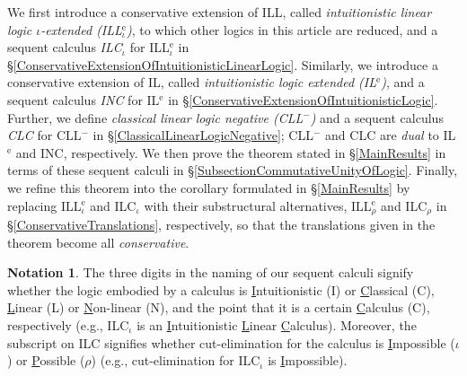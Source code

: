 \documentclass[a4paper]{article}
\theoremstyle{definition}
\newtheorem{notation}[definition]{Notation}
\theoremstyle{theorem}
\theoremstyle{remark}
\begin{document}
We first introduce a conservative extension of ILL, called \emph{intuitionistic linear logic $\iota$-extended (ILL$^{\text{e}}_{\iota}$)}, to which other logics in this article are reduced, and a sequent calculus \emph{\textsf{ILC$_{\iota}$}} for ILL$^{\text{e}}_{\iota}$ in \S\ref{ConservativeExtensionOfIntuitionisticLinearLogic}.
Similarly, we introduce a conservative extension of IL, called \emph{intuitionistic logic extended (IL$^{\text{e}}$)}, and a sequent calculus \emph{\textsf{INC}} for IL$^{\text{e}}$ in \S\ref{ConservativeExtensionOfIntuitionisticLogic}.
Further, we define \emph{classical linear logic negative (CLL$^-$)} and a sequent calculus \emph{\textsf{CLC}} for CLL$^-$ in \S\ref{ClassicalLinearLogicNegative}; CLL$^-$ and \textsf{CLC} are \emph{dual} to IL$^{\text{e}}$ and \textsf{INC}, respectively.
We then prove the theorem stated in \S\ref{MainResults} in terms of these sequent calculi in \S\ref{SubsectionCommutativeUnityOfLogic}.
Finally, we refine this theorem into the corollary formulated in \S\ref{MainResults} by replacing ILL$^{\text{e}}_{\iota}$ and \textsf{ILC$_{\iota}$} with their substructural alternatives, ILL$^{\text{e}}_{\rho}$ and \textsf{ILC$_{\rho}$} in \S\ref{ConservativeTranslations}, respectively, so that the translations given in the theorem become all \emph{conservative}.

\begin{notation}
The three digits in the naming of our sequent calculi signify whether the logic embodied by a calculus is \underline{I}ntuitionistic (\textsf{I}) or \underline{C}lassical (\textsf{C}), \underline{L}inear (\textsf{L}) or \underline{N}on-linear (\textsf{N}), and the point that it is a certain \underline{C}alculus (\textsf{C}), respectively (e.g., \textsf{ILC$_\iota$} is an \underline{I}ntuitionistic \underline{L}inear \underline{C}alculus).
Moreover, the subscript on \textsf{ILC} signifies whether cut-elimination for the calculus is \underline{I}mpossible ($\iota$) or \underline{P}ossible ($\rho$) (e.g., cut-elimination for \textsf{ILC$_\iota$} is \underline{I}mpossible).
\end{notation}
\end{document}
